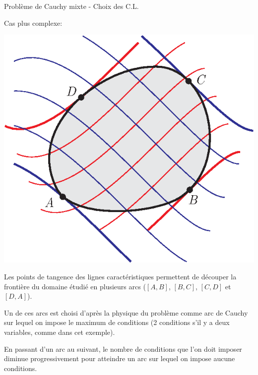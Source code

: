 \documentclass[
mode=present,    %
paper=a4paper,   %
orient=landscape,
display=slides,   %
size=10pt,
style=romain   %
]{powerdot}
\begin{document}
\begin{slide}[toc=]{Problème de Cauchy mixte - Choix des C.L.}

Cas plus complexe:
\bigskip

\begin{minipage}[l]{0.4\textwidth}
    \centerline{\includegraphics[width=\textwidth]{bc2a.eps} }
\end{minipage}
\begin{minipage}[l]{0.55\textwidth}
Les points de tangence des lignes caractéristiques permettent de découper la frontière du domaine étudié en plusieurs arcs ($[A,B]$, $[B,C]$, $[C,D]$ et $[D,A]$).

\bigskip

Un de ces arcs est choisi d'après la physique du problème comme arc de Cauchy sur lequel on impose le maximum de conditions (2 conditions s'il y a deux variables, comme dans cet exemple).
\end{minipage}

\bigskip

En passant d'un arc au suivant, le nombre de conditions que l'on doit imposer diminue progressivement pour atteindre un arc sur lequel on impose aucune conditions.

\end{slide}
\end{document}
